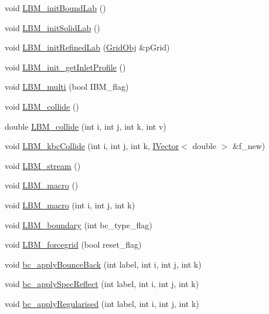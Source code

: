 \begin{DoxyCompactItemize}
\item 
void \hyperlink{class_grid_obj_a4b6edceeda49496365e725eb67931961}{L\+B\+M\+\_\+init\+Bound\+Lab} ()
\item 
void \hyperlink{class_grid_obj_a5dd08730d7cdea576bb4b337786a9bcf}{L\+B\+M\+\_\+init\+Solid\+Lab} ()
\item 
void \hyperlink{class_grid_obj_a3ba133d06625fb576ca0909b946033b2}{L\+B\+M\+\_\+init\+Refined\+Lab} (\hyperlink{class_grid_obj}{Grid\+Obj} \&p\+Grid)
\item 
void \hyperlink{class_grid_obj_a023713976673d029103690a91c5415f9}{L\+B\+M\+\_\+init\+\_\+get\+Inlet\+Profile} ()
\item 
void \hyperlink{class_grid_obj_af9f81ad6b70fb16997ef88f0c19de5b8}{L\+B\+M\+\_\+multi} (bool I\+B\+M\+\_\+flag)
\item 
void \hyperlink{class_grid_obj_a0feb0f9406f626e90c57045350161b22}{L\+B\+M\+\_\+collide} ()
\item 
double \hyperlink{class_grid_obj_a1540c0d77a47e60a7fd55f51e5a98451}{L\+B\+M\+\_\+collide} (int i, int j, int k, int v)
\item 
void \hyperlink{class_grid_obj_ac4ca0327a53171fe8e1c3076e9f1353f}{L\+B\+M\+\_\+kbc\+Collide} (int i, int j, int k, \hyperlink{class_i_vector}{I\+Vector}$<$ double $>$ \&f\+\_\+new)
\item 
void \hyperlink{class_grid_obj_a5b5cb1f3136da8cbff96955d9c6d9e5b}{L\+B\+M\+\_\+stream} ()
\item 
void \hyperlink{class_grid_obj_a25382158b7747da7c0639aed513ae39c}{L\+B\+M\+\_\+macro} ()
\item 
void \hyperlink{class_grid_obj_ab69942450175d12c75f4b8d33b06c905}{L\+B\+M\+\_\+macro} (int i, int j, int k)
\item 
void \hyperlink{class_grid_obj_a23d89d6111dd46653b2b1f79a5c7fbf1}{L\+B\+M\+\_\+boundary} (int bc\+\_\+type\+\_\+flag)
\item 
void \hyperlink{class_grid_obj_a884b3fc103cf8035438ea8f144bff5bb}{L\+B\+M\+\_\+forcegrid} (bool reset\+\_\+flag)
\item 
void \hyperlink{class_grid_obj_a2dc94b1d2e3f14a1a086b8bfa078839b}{bc\+\_\+apply\+Bounce\+Back} (int label, int i, int j, int k)
\item 
void \hyperlink{class_grid_obj_ae1d63a43d1dee6c7b25880c8a9bb97c9}{bc\+\_\+apply\+Spec\+Reflect} (int label, int i, int j, int k)
\item 
void \hyperlink{class_grid_obj_a5602705b2575b09e27dd0065de3542f6}{bc\+\_\+apply\+Regularised} (int label, int i, int j, int k)

\end{DoxyCompactItemize}
